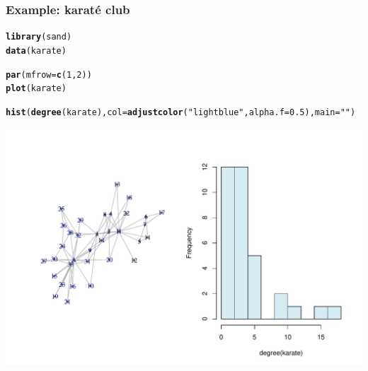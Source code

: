 \documentclass{beamer}\usepackage[]{graphicx}\usepackage[]{color}
\makeatletter
\newcommand{\hlnum}[1]{\textcolor[rgb]{0.686,0.059,0.569}{#1}}%
\newcommand{\hlstr}[1]{\textcolor[rgb]{0.192,0.494,0.8}{#1}}%
\newcommand{\hlstd}[1]{\textcolor[rgb]{0.345,0.345,0.345}{#1}}%
\newcommand{\hlkwc}[1]{\textcolor[rgb]{0.333,0.667,0.333}{#1}}%
\newcommand{\hlkwd}[1]{\textcolor[rgb]{0.737,0.353,0.396}{\textbf{#1}}}%
\newenvironment{kframe}{%
 \def\at@end@of@kframe{}%
 \ifinner\ifhmode%
  \def\at@end@of@kframe{\end{minipage}}%
  \begin{minipage}{\columnwidth}%
 \fi\fi%
 \def\FrameCommand##1{\hskip\@totalleftmargin \hskip-\fboxsep
 \colorbox{shadecolor}{##1}\hskip-\fboxsep
     \hskip-\linewidth \hskip-\@totalleftmargin \hskip\columnwidth}%
 \MakeFramed {\advance\hsize-\width
   \@totalleftmargin\z@ \linewidth\hsize
   \@setminipage}}%
 {\par\unskip\endMakeFramed%
 \at@end@of@kframe}
\newenvironment{knitrout}{}{} %
\makeatother
\begin{document}
\begin{frame}
  \frametitle{Example: karaté club}

\begin{knitrout}\scriptsize
{}\color{fgcolor}\begin{kframe}
\begin{alltt}
\hlkwd{library}\hlstd{(sand)}
\hlkwd{data}\hlstd{(karate)}

\hlkwd{par}\hlstd{(}\hlkwc{mfrow}\hlstd{=}\hlkwd{c}\hlstd{(}\hlnum{1}\hlstd{,}\hlnum{2}\hlstd{))}
\hlkwd{plot}\hlstd{(karate)}

\hlkwd{hist}\hlstd{(}\hlkwd{degree}\hlstd{(karate),} \hlkwc{col}\hlstd{=}\hlkwd{adjustcolor}\hlstd{(}\hlstr{"lightblue"}\hlstd{,} \hlkwc{alpha.f} \hlstd{=} \hlnum{0.5}\hlstd{),} \hlkwc{main}\hlstd{=}\hlstr{""}\hlstd{)}
\end{alltt}
\end{kframe}
\includegraphics[width=.8\textwidth]{figures/degree_1-1} 

\end{knitrout}
      
\end{frame}
\end{document}
